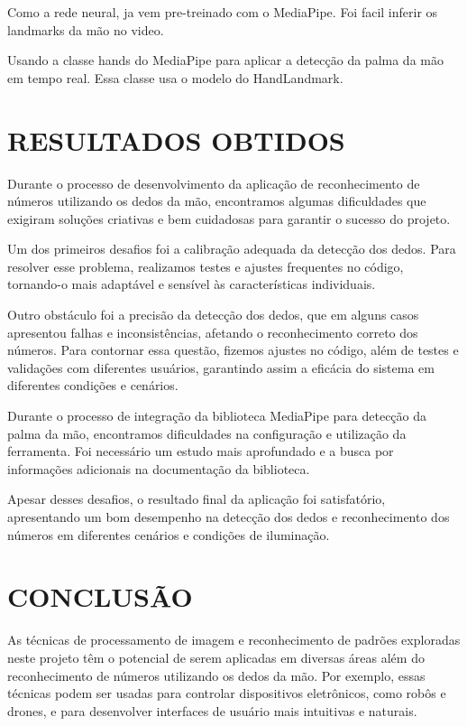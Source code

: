 \documentclass[12pt,a4paper]{article}
\begin{document}
        Como a rede neural, ja vem pre-treinado com o MediaPipe. Foi facil inferir os landmarks da mão no video.

        Usando a classe hands do MediaPipe para aplicar a detecção da palma da mão em tempo real. Essa classe usa o modelo do HandLandmark.


    \newpage

    \section{RESULTADOS OBTIDOS}
    
        Durante o processo de desenvolvimento da aplicação de reconhecimento de números utilizando os dedos da mão, encontramos algumas dificuldades que exigiram soluções criativas e bem cuidadosas para garantir o sucesso do projeto.

        Um dos primeiros desafios foi a calibração adequada da detecção dos dedos. Para resolver esse problema, realizamos testes e ajustes frequentes no código, tornando-o mais adaptável e sensível às características individuais.

        Outro obstáculo foi a precisão da detecção dos dedos, que em alguns casos apresentou falhas e inconsistências, afetando o reconhecimento correto dos números. Para contornar essa questão, fizemos ajustes no código, além de testes e validações com diferentes usuários, garantindo assim a eficácia do sistema em diferentes condições e cenários.

        Durante o processo de integração da biblioteca MediaPipe para detecção da palma da mão, encontramos dificuldades na configuração e utilização da ferramenta. Foi necessário um estudo mais aprofundado e a busca por informações adicionais na documentação da biblioteca.

        Apesar desses desafios, o resultado final da aplicação foi satisfatório, apresentando um bom desempenho na detecção dos dedos e reconhecimento dos números em diferentes cenários e condições de iluminação.

        \newpage
        
    
    \section*{CONCLUSÃO}
    \thispagestyle{myheadings}
    \markright{ }

        As técnicas de processamento de imagem e reconhecimento de padrões exploradas neste projeto têm o potencial de serem aplicadas em diversas áreas além do reconhecimento de números utilizando os dedos da mão. Por exemplo, essas técnicas podem ser usadas para controlar dispositivos eletrônicos, como robôs e drones, e para desenvolver interfaces de usuário mais intuitivas e naturais.
\end{document}
